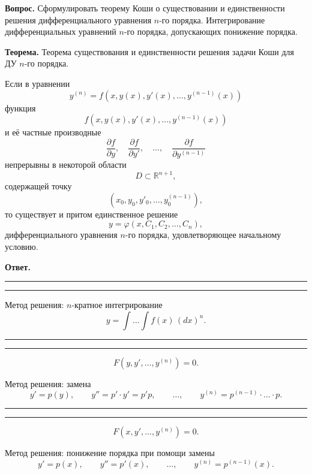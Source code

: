 \documentclass[a4paper,11pt]{article}
\newcommand{\examquestion}[1]{
\begin{questionbox}
\textbf{Вопрос.} #1
\end{questionbox}
}
\newcommand{\examanswer}[1]{
\begin{answerbox}
\textbf{Ответ.} #1
\end{answerbox}
}
\newcommand{\examtheorem}[1]{
\begin{theorembox}
\textbf{Теорема.} #1
\end{theorembox}
}
\newcommand{\examstep}[1]{
\par\smallskip
\noindent\textcolor{answercolor}{\rule{\linewidth}{0.4pt}}
\par\vspace{-2pt}
\noindent{\textbf{\textcolor{answercolor}{#1}}}
\par\vspace{-4pt}
\noindent\textcolor{answercolor}{\rule{\linewidth}{0.4pt}}
\par\smallskip
}
\begin{document}
\examquestion{Сформулировать теорему Коши о существовании и единственности решения дифференциального уравнения $n$-го порядка. Интегрирование дифференциальных уравнений $n$-го порядка, допускающих понижение порядка.}

\examtheorem{
Теорема существования и единственности решения задачи Коши для ДУ $n$-го порядка.

Если в уравнении
\[
y^{(n)} = f(x,y(x),y'(x),\dots,y^{(n-1)}(x))
\]
функция
\[
f(x,y(x),y'(x),\dots,y^{(n-1)}(x))
\]
и её частные производные
\[
\frac{\partial f}{\partial y},\quad \frac{\partial f}{\partial y'},\quad \dots,\quad \frac{\partial f}{\partial y^{(n-1)}}
\]
непрерывны в некоторой области
\[
D \subset \mathbb{R}^{n+1},
\]
содержащей точку
\[
(x_0, y_0, y'_0, \dots, y^{(n-1)}_0),
\]
то существует и притом единственное решение
\[
y = \varphi(x, C_1, C_2, \dots, C_n),
\]
дифференциального уравнения $n$-го порядка, удовлетворяющее начальному условию.
}

\examanswer{

\examstep{1. Уравнения вида $y^{(n)} = f(x)$}

Метод решения: $n$-кратное интегрирование
\[
y = \int \dots \int f(x)\,(dx)^n.
\]

\examstep{2. Уравнения, не содержащие переменную $x$ явно}

\[
F(y, y', \dots, y^{(n)}) = 0.
\]

Метод решения: замена
\[
y' = p(y),
\qquad
y'' = p' \cdot y' = p' p,
\qquad \dots,
\qquad
y^{(n)} = p^{(n-1)} \cdot \dots \cdot p.
\]

\examstep{3. Уравнения, не содержащие функцию $y$ в явном виде}

\[
F(x, y', \dots, y^{(n)}) = 0.
\]

Метод решения: понижение порядка при помощи замены
\[
y' = p(x),
\qquad
y'' = p'(x),
\qquad \dots,
\qquad
y^{(n)} = p^{(n-1)}(x).
\]

}
\end{document}
